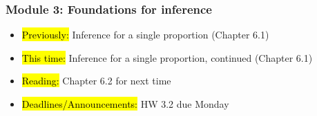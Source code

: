 
\begin{frame}
    \frametitle{Module 3: Foundations for inference}
    \begin{itemize}
        \item \hl{Previously: }Inference for a single proportion (Chapter 6.1)
        \item \hl{This time: }Inference for a single proportion, continued (Chapter 6.1)
        \item \hl{Reading: }Chapter 6.2 for next time
        \item \hl{Deadlines/Announcements: }HW 3.2 due Monday
    \end{itemize}
    
\end{frame}